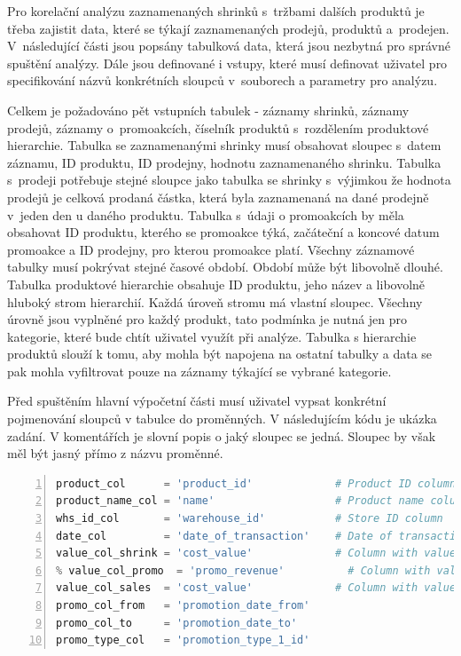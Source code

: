 Pro korelační analýzu zaznamenaných shrinků s~tržbami dalších produktů je třeba zajistit data, které se týkají zaznamenaných prodejů, produktů a~prodejen. V~následující části jsou popsány tabulková data, která jsou nezbytná pro správné spuštění analýzy. Dále jsou definované i vstupy, které musí definovat uživatel pro specifikování názvů konkrétních sloupců v~souborech a parametry pro analýzu.

Celkem je požadováno pět vstupních tabulek - záznamy shrinků, záznamy prodejů, záznamy o~promoakcích, číselník produktů s~rozdělením produktové hierarchie. %
Tabulka se zaznamenanými shrinky musí obsahovat sloupec s~datem záznamu, ID produktu, ID prodejny, hodnotu zaznamenaného shrinku. Tabulka s~prodeji potřebuje stejné sloupce jako tabulka se shrinky s~výjimkou že hodnota prodejů je celková prodaná částka, která byla zaznamenaná na dané prodejně v~jeden den u daného produktu. Tabulka s~údaji o promoakcích by měla obsahovat ID produktu, kterého se promoakce týká, začáteční a koncové datum promoakce a ID prodejny, pro kterou promoakce platí.
Všechny záznamové tabulky musí pokrývat stejné časové období. Období může být libovolně dlouhé.
Tabulka produktové hierarchie obsahuje ID produktu, jeho název a libovolně hluboký strom hierarchií. Každá úroveň stromu má vlastní sloupec. Všechny úrovně jsou vyplněné pro každý produkt, tato podmínka je nutná jen pro kategorie, které bude chtít uživatel využít při analýze. 
Tabulka s hierarchie produktů slouží k tomu, aby mohla být napojena na ostatní tabulky a data se pak mohla vyfiltrovat pouze na záznamy týkající se vybrané kategorie.

Před spuštěním hlavní výpočetní části musí uživatel vypsat konkrétní pojmenování sloupců v tabulce do proměnných. V následujícím kódu je ukázka zadání. V komentářích je slovní popis o jaký sloupec se jedná. Sloupec by však měl být jasný přímo z názvu proměnné.

\begin{lstlisting}[language=Python, frame=none, numbers=left, numberstyle=\numberstyle, backgroundcolor=\color{backcolour}]
product_col      = 'product_id'             # Product ID column
product_name_col = 'name'                   # Product name column
whs_id_col       = 'warehouse_id'           # Store ID column
date_col         = 'date_of_transaction'    # Date of transactions column - for sales and shrinks tables
value_col_shrink = 'cost_value'             # Column with value of shrinks (shrink table)
% value_col_promo  = 'promo_revenue'          # Column with value of promo sales (sales table)
value_col_sales  = 'cost_value'             # Column with value of total sales (sales table)
promo_col_from   = 'promotion_date_from'    
promo_col_to     = 'promotion_date_to'
promo_type_col   = 'promotion_type_1_id'
\end{lstlisting}

